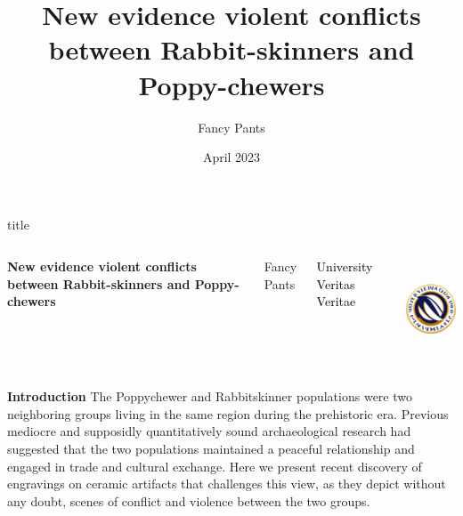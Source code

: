 \documentclass[final]{beamer}
\title[R\&P peace]{New evidence violent conflicts between Rabbit-skinners and Poppy-chewers}
\author[Pants]{Fancy Pants}
\date{April 2023}
\begin{document}
\begin{frame}[t]
    \vspace{-.5cm}
    \begin{beamercolorbox}[wd=\paperwidth]{title}
    \vspace{.6cm}
        \begin{columns}


            {
                \raggedleft
                \textcolor{redcaa}{\textbf{New evidence violent conflicts between Rabbit-skinners and Poppy-chewers}} \par
                \textcolor{redcaa}{Fancy Pants}\par
                \textcolor{black}{University Veritas Veritae}\par
            }

            \includegraphics[height=3cm]{universHS.png}
        \end{columns}
    \vspace{.8cm}

    \end{beamercolorbox}


    \vspace{2cm}


    \begin{columns}[t]

        \begin{block}{\textbf{Introduction}}
            The Poppychewer and Rabbitskinner populations were two neighboring groups living in the same region during the prehistoric era. Previous mediocre and supposidly quantitatively sound archaeological research had suggested that the two populations maintained a peaceful relationship and engaged in trade and cultural exchange. Here we present recent discovery of engravings on ceramic artifacts that challenges this view, as they depict without any doubt, scenes of conflict and violence between the two groups.
        \end{block}


\end{columns}
\end{frame}
\end{document}
